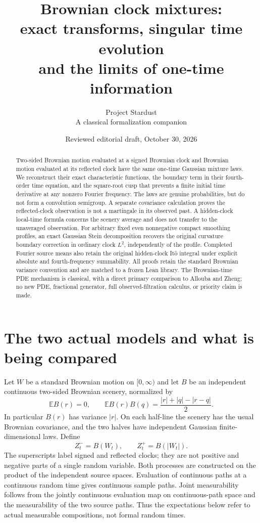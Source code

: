 \documentclass[11pt]{article}
\title{Brownian clock mixtures:\protect\\exact transforms, singular time evolution\protect\\and the limits of one-time information}
\author{Project Stardust\\\small A classical formalization companion}
\date{Reviewed editorial draft, October 30, 2026}
\newcommand{\E}{\mathbb E}
\begin{document}
\maketitle
\begin{abstract}
Two-sided Brownian motion evaluated at a signed Brownian clock and
Brownian motion evaluated at its reflected clock have the same one-time
Gaussian mixture laws. We reconstruct their exact characteristic
functions, the boundary term in their fourth-order time equation,
and the square-root cusp that prevents a finite initial time derivative
at any nonzero Fourier frequency. The laws are genuine probabilities,
but do not form a convolution semigroup. A separate covariance
calculation proves the reflected-clock observation is not a martingale
in its observed past. A hidden-clock local-time formula concerns the
scenery average and does not transfer to the unaveraged observation.
For arbitrary fixed even nonnegative compact smoothing profiles, an exact
Gaussian Stein decomposition recovers the original curvature boundary
correction in ordinary clock $L^2$, independently of the profile.
Completed Fourier source means also retain the original hidden-clock
It\^o integral under explicit absolute and fourth-frequency summability.
All proofs retain the standard Brownian variance convention and are
matched to a frozen Lean library. The Brownian-time PDE mechanism is
classical, with a direct primary comparison to Allouba and Zheng;
no new PDE, fractional generator, full observed-filtration calculus,
or priority claim is made.
\end{abstract}

\section{The two actual models and what is being compared}
Let $W$ be a standard Brownian motion on $[0,\infty)$ and let $B$
be an independent continuous two-sided Brownian scenery, normalized by
\begin{equation}\label{eq:scenery}
 \E B(r)=0,\qquad
 \E B(r)B(q)=\frac{|r|+|q|-|r-q|}{2}.
\end{equation}
In particular $B(r)$ has variance $|r|$. On each half-line the
scenery has the usual Brownian covariance, and the two halves have
independent Gaussian finite-dimensional laws. Define
\[
 Z_t^-=B(W_t),\qquad Z_t^+=B(|W_t|).
\]
The superscripts label signed and reflected clocks; they are not
positive and negative parts of a single random variable. Both
processes are constructed on the product of the independent source
spaces. Evaluation of continuous paths at a continuous random time
gives continuous sample paths. Joint measurability follows from the
jointly continuous evaluation map on continuous-path space and the
measurability of the two source paths. Thus the expectations below
refer to actual measurable compositions, not formal random times.
\end{document}
